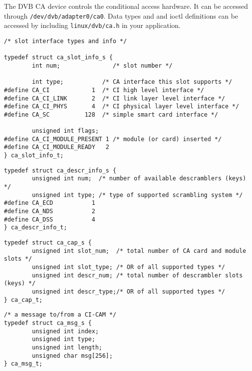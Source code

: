 
The DVB CA device controls the conditional access hardware.
It can be accessed through \texttt{/dev/dvb/adapter0/ca0}.
Data types and and ioctl definitions can be accessed by including
\texttt{linux/dvb/ca.h} in your application.



\label{caslotinfo}

\begin{verbatim}
/* slot interface types and info */

typedef struct ca_slot_info_s {
        int num;               /* slot number */

        int type;           /* CA interface this slot supports */
#define CA_CI            1  /* CI high level interface */
#define CA_CI_LINK       2  /* CI link layer level interface */
#define CA_CI_PHYS       4  /* CI physical layer level interface */
#define CA_SC          128  /* simple smart card interface */

        unsigned int flags;
#define CA_CI_MODULE_PRESENT 1 /* module (or card) inserted */
#define CA_CI_MODULE_READY   2
} ca_slot_info_t;
\end{verbatim}

\label{cadescrinfo}

\begin{verbatim}
typedef struct ca_descr_info_s {
        unsigned int num;  /* number of available descramblers (keys) */ 
        unsigned int type; /* type of supported scrambling system */
#define CA_ECD           1
#define CA_NDS           2
#define CA_DSS           4
} ca_descr_info_t;
\end{verbatim}

\label{cacap}

\begin{verbatim}
typedef struct ca_cap_s {
        unsigned int slot_num;  /* total number of CA card and module slots */
        unsigned int slot_type; /* OR of all supported types */
        unsigned int descr_num; /* total number of descrambler slots (keys) */
        unsigned int descr_type;/* OR of all supported types */
} ca_cap_t;
\end{verbatim}


\label{camsg}

\begin{verbatim}
/* a message to/from a CI-CAM */
typedef struct ca_msg_s {   
        unsigned int index;         
        unsigned int type;
        unsigned int length;
        unsigned char msg[256];
} ca_msg_t;
\end{verbatim}


